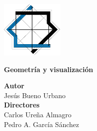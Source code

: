 \begin{titlepage}
 
\thispagestyle{empty}
\setlength{\centeroffset}{-0.5\oddsidemargin}
\addtolength{\centeroffset}{0.5\evensidemargin}
\thispagestyle{empty}

\noindent\hspace*{\centeroffset}\begin{minipage}{\textwidth}

\centering



 \vspace{3.3cm}

\includegraphics{images/mm.pdf} 
 \vspace{0.5cm}


{\Huge\bfseries Geometría y visualización\\
}
\end{minipage}

\vspace{2.5cm}
\noindent\hspace*{\centeroffset}\begin{minipage}{\textwidth}
\centering

\textbf{Autor}\\ {Jesús Bueno Urbano}\\[2.5ex]
\textbf{Directores}\\
{Carlos Ureña Almagro\\
Pedro A. García Sánchez}\\[2cm]
\end{minipage}

 
\end{titlepage}


